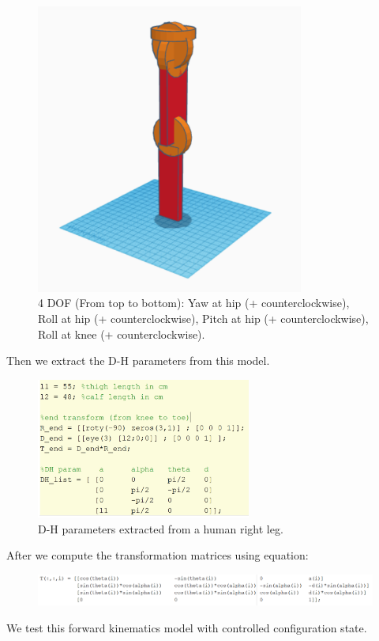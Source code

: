 \documentclass{article}
\begin{document}
\begin{figure}[H]
\centering
\includegraphics[width=250pt]{leg}
\caption{4 DOF (From top to bottom): Yaw at hip (+ counterclockwise),  Roll at hip (+ counterclockwise), Pitch at hip (+ counterclockwise), Roll at knee (+ counterclockwise).}
\end{figure}

Then we extract the D-H parameters from this model.

\begin{figure}[H]
\centering
\includegraphics[width=200pt]{leg_para}
\caption{D-H parameters extracted from a human right leg.}
\end{figure}

After we compute the transformation matrices using equation:

\begin{figure}[H]
\centering
\includegraphics[width=\textwidth]{trans}
\end{figure}

We test this forward kinematics model with controlled configuration state. 
\end{document}
